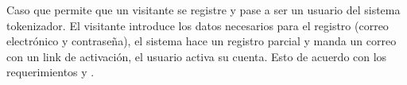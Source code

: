 %
%

{
  Caso que permite que un visitante se registre y pase a ser
  un usuario del sistema tokenizador. El visitante introduce los datos
  necesarios para el registro (correo electrónico y contraseña), el sistema
  hace un registro parcial y manda un correo con un link de activación, el
  usuario activa su cuenta. Esto de acuerdo con los requerimientos
   y
  .
}
